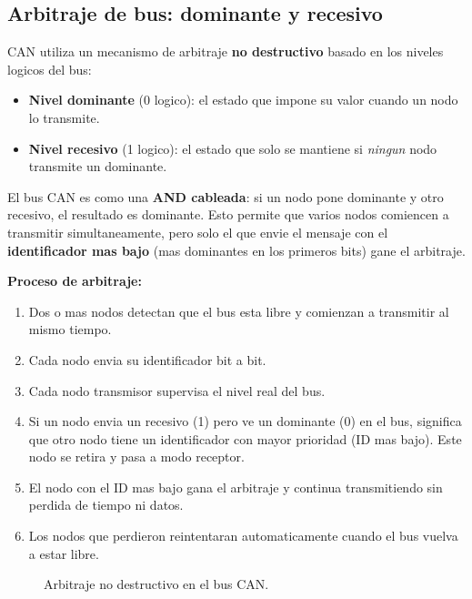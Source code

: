 \subsection{Arbitraje de bus: dominante y recesivo}

CAN utiliza un mecanismo de arbitraje \textbf{no destructivo} basado en los
niveles logicos del bus:

\begin{itemize}
    \item \textbf{Nivel dominante} (0 logico): el estado que impone su valor
    cuando un nodo lo transmite.
    \item \textbf{Nivel recesivo} (1 logico): el estado que solo se mantiene si
    \textit{ningun} nodo transmite un dominante.
\end{itemize}

El bus CAN es como una \textbf{AND cableada}: si un nodo pone dominante y otro
recesivo, el resultado es dominante. Esto permite que varios nodos comiencen a
transmitir simultaneamente, pero solo el que envie el mensaje con el
\textbf{identificador mas bajo} (mas dominantes en los primeros bits) gane el
arbitraje.

\textbf{Proceso de arbitraje:}
\begin{enumerate}
    \item Dos o mas nodos detectan que el bus esta libre y comienzan a transmitir
    al mismo tiempo.
    \item Cada nodo envia su identificador bit a bit.
    \item Cada nodo transmisor supervisa el nivel real del bus.
    \item Si un nodo envia un recesivo (1) pero ve un dominante (0) en el bus,
    significa que otro nodo tiene un identificador con mayor prioridad (ID mas
    bajo). Este nodo se retira y pasa a modo receptor.
    \item El nodo con el ID mas bajo gana el arbitraje y continua transmitiendo
    sin perdida de tiempo ni datos.
    \item Los nodos que perdieron reintentaran automaticamente cuando el bus vuelva
    a estar libre.
\end{enumerate}

\begin{figure}[H]
    \centering
    \caption{Arbitraje no destructivo en el bus CAN.}
    \label{fig:can_arbitraje}
\end{figure}

